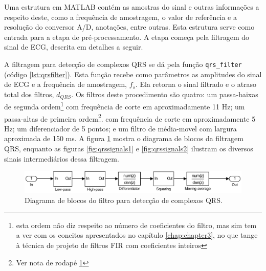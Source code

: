 Uma estrutura em MATLAB contém as amostras do sinal e outras informações a respeito deste, como a frequência de amostragem, o valor de referência e a resolução do conversor A/D, anotações, entre outras. Esta estrutura serve como entrada para a etapa de pré-processamento. A etapa começa pela filtragem do sinal de ECG, descrita em detalhes a seguir.

A filtragem para detecção de complexos QRS se dá pela função \texttt{qrs\_filter} (código \ref{lst:qrsfilter}). Esta função recebe como parâmetros as amplitudes do sinal de ECG e a frequência de amostragem, $f_s$. Ela retorna o sinal filtrado e o atraso total dos filtros, $d_{QRS}$. Os filtros deste procedimento são quatro: um passa-baixas de segunda ordem\footnote{\label{fnt:note1}esta ordem não diz respeito ao número de coeficientes do filtro, mas sim tem a ver com os coneitos apresentados no capítulo \ref{chap:chapter3}, no que tange à técnica de projeto de filtros FIR com coeficientes inteiros} com frequência de corte em aproximadamente 11 Hz; um passa-altas de primeira ordem\footnote{Ver nota de rodapé \ref{fnt:note1}}. com frequência de corte em aproximadamente 5 Hz; um diferenciador de 5 pontos; e um filtro de média-movel com largura aproximada de 150 ms. A figura \ref{fig:qrsfilter} mostra o diagrama de blocos da filtragem QRS, enquanto as figuras \ref{fig:qrssignals1} e \ref{fig:qrssignals2} ilustram os diversos sinais intermediários dessa filtragem.

\begin{figure}[ht]
    \centering
    \includegraphics[width=450pt]{figures/chap6-qrs-filter.pdf}
    \caption[Diagrama de blocos do filtro QRS]{Diagrama de blocos do filtro para detecção de complexos QRS.}
    \label{fig:qrsfilter}
\end{figure}

